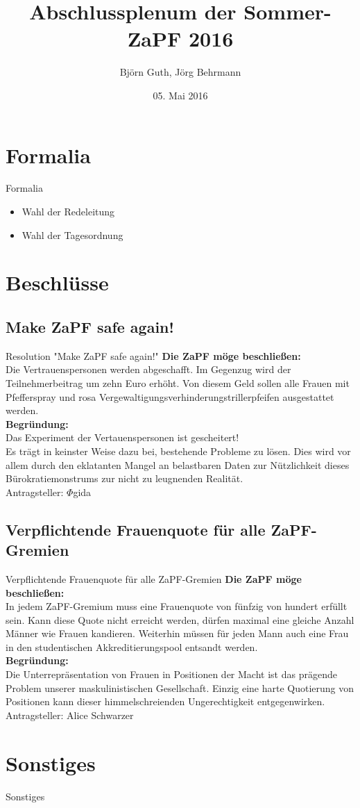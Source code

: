 \documentclass[compress, aspectratio=169]{beamer}
\title[Abschlussplenum SoSe16]{Abschlussplenum der Sommer-ZaPF 2016}
\author{Björn Guth, Jörg Behrmann}
\institute[Zusammenkunft aller Physikfachschaften]
\date{05. Mai 2016}
\begin{document}
\begin{frame}[plain]{}
  \titlepage
\end{frame}

\section{Formalia}
\begin{frame}{Formalia}
	\begin{itemize}
		\item Wahl der Redeleitung
		\item Wahl der Tagesordnung
	\end{itemize}
\end{frame}

\section{Beschlüsse}
\subsection{Make ZaPF safe again!}
\begin{frame}{Resolution "Make ZaPF safe again!"}
	\textbf{Die ZaPF möge beschließen:}\\
	Die Vertrauenspersonen werden abgeschafft. Im Gegenzug wird der Teilnehmerbeitrag um zehn Euro erhöht. Von diesem Geld sollen alle Frauen mit Pfefferspray und rosa Vergewaltigungsverhinderungstrillerpfeifen ausgestattet werden.\\
	\textbf{Begründung:}\\
	Das Experiment der Vertauenspersonen ist gescheitert!\\
	Es trägt in keinster Weise dazu bei, bestehende Probleme zu lösen. Dies wird vor allem durch den eklatanten Mangel an belastbaren Daten zur Nützlichkeit dieses Bürokratiemonstrums zur nicht zu leugnenden Realität.\\
	\hfill Antragsteller: $\Phi{}$gida
\end{frame}

\subsection{Verpflichtende Frauenquote für alle ZaPF-Gremien}
\begin{frame}{Verpflichtende Frauenquote für alle ZaPF-Gremien}
	\textbf{Die ZaPF möge beschließen:}\\
	In jedem ZaPF-Gremium muss eine Frauenquote von fünfzig von hundert erfüllt sein. Kann diese Quote nicht erreicht werden, dürfen maximal eine gleiche Anzahl Männer wie Frauen kandieren. Weiterhin müssen für jeden Mann auch eine Frau in den studentischen Akkreditierungspool entsandt werden.\\
	\textbf{Begründung:}\\
	Die Unterrepräsentation von Frauen in Positionen der Macht ist das prägende Problem unserer maskulinistischen Gesellschaft. Einzig eine harte Quotierung von Positionen kann dieser himmelschreienden Ungerechtigkeit entgegenwirken.\\
	\hfill Antragsteller: Alice Schwarzer
\end{frame}

\section{Sonstiges}
\begin{frame}{Sonstiges}
\end{frame}
\end{document}
